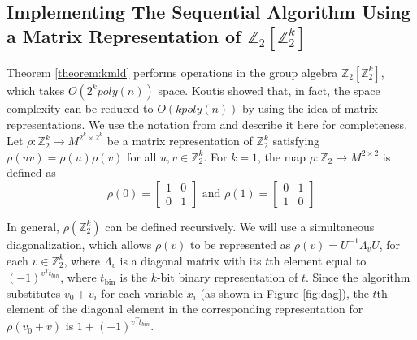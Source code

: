 

\subsection{Implementing The Sequential Algorithm Using a Matrix Representation
of $\mathbb{Z}_2[\mathbb{Z}_2^k]$}

Theorem \ref{theorem:kmld} performs operations in the group algebra $\mathbb{Z}_2[\mathbb{Z}_2^k]$,
which takes $O(2^k poly(n))$ space. Koutis \cite{koutis:icalp08} showed that, in fact, the space
complexity can be reduced to $O(k poly(n))$ by using the idea of matrix representations.
We use the notation from \cite{koutis:icalp08} and describe it here for completeness.
Let $\rho:\mathbb{Z}_2^k\rightarrow M^{2^k\times 2^k}$ be a matrix representation of
$\mathbb{Z}_2^k$ satisfying $\rho(uv)=\rho(u)\rho(v)$ for all $u, v\in \mathbb{Z}_2^k$.
For $k=1$, the map $\rho:\mathbb{Z}_2\rightarrow M^{2\times 2}$ is defined as
\[
\rho(0) = 
\begin{bmatrix}
1 & 0\\
0 & 1
\end{bmatrix}
\mbox{ and }
\rho(1) = 
\begin{bmatrix}
0 & 1\\
1 & 0
\end{bmatrix}
\]

In general, $\rho(\mathbb{Z}_2^k)$ can be defined recursively. We will use a
simultaneous diagonalization, which allows $\rho(v)$ to be represented as
$\rho(v) = U^{-1}\Lambda_v U$, for each $v\in \mathbb{Z}_2^k$, where $\Lambda_v$ is
a diagonal matrix with its $t$th element equal to $(-1)^{v^T t_{bin}}$,
where $t_{\text{bin}}$ is the $k$-bit binary representation of $t$.
Since the algorithm substitutes $v_0+v_i$ for each variable $x_i$ (as shown in
Figure \ref{fig:dag}), the $t$th element of the diagonal element in the corresponding
representation for $\rho(v_0+v)$ is $1+(-1)^{v^T t_{bin}}$.

